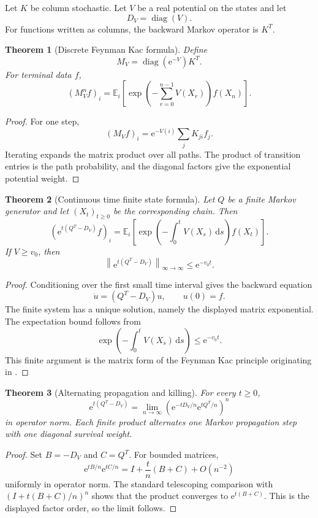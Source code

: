\documentclass{aomart}
\newtheorem{theorem}{Theorem}[section]
\theoremstyle{definition}
\theoremstyle{remark}
\newcommand{\Exp}{\mathbb E}
\newcommand{\diag}{\operatorname{diag}}
\newcommand{\e}{\mathrm e}
\newcommand{\dd}{\,\mathrm d}
\newcommand{\norm}[1]{\left\lVert#1\right\rVert}
\begin{document}
Let \(K\) be column stochastic. Let \(V\) be a real potential on the states and let
\[
D_V=\diag(V).
\]
For functions written as columns, the backward Markov operator is \(K^T\).

\begin{theorem}[Discrete Feynman Kac formula]\label{thm:discrete_feynman_kac}
Define
\[
M_V=\diag(\e^{-V})K^T.
\]
For terminal data \(f\),
\[
(M_V^nf)_i
=
\Exp_i\left[
\exp\left(
-\sum_{r=0}^{n-1}V(X_r)
\right)
f(X_n)
\right].
\]
\end{theorem}

\begin{proof}
For one step,
\[
(M_Vf)_i
=
\e^{-V(i)}\sum_jK_{ji}f_j.
\]
Iterating expands the matrix product over all paths. The product of transition entries is the path probability, and the diagonal factors give the exponential potential weight.
\end{proof}

\begin{theorem}[Continuous time finite state formula]\label{thm:continuous_feynman_kac}
Let \(Q\) be a finite Markov generator and let \((X_t)_{t\geq0}\) be the corresponding chain. Then
\[
\left(
\e^{t(Q^T-D_V)}f
\right)_i
=
\Exp_i\left[
\exp\left(
-\int_0^tV(X_s)\dd s
\right)
f(X_t)
\right].
\]
If \(V\geq v_0\), then
\[
\norm{\e^{t(Q^T-D_V)}}_{\infty\to\infty}
\leq
\e^{-v_0t}.
\]
\end{theorem}

\begin{proof}
Conditioning over the first small time interval gives the backward equation
\[
\dot u=(Q^T-D_V)u,
\qquad
u(0)=f.
\]
The finite system has a unique solution, namely the displayed matrix exponential. The expectation bound follows from
\[
\exp\left(-\int_0^tV(X_s)\dd s\right)
\leq
\e^{-v_0t}.
\]
This finite argument is the matrix form of the Feynman Kac principle originating in \cite{Kac1949}.
\end{proof}

\begin{theorem}[Alternating propagation and killing]\label{thm:feynman_kac_product}
For every \(t\geq0\),
\[
\e^{t(Q^T-D_V)}
=
\lim_{n\to\infty}
\left(
\e^{-tD_V/n}\e^{tQ^T/n}
\right)^n
\]
in operator norm. Each finite product alternates one Markov propagation step with one diagonal survival weight.
\end{theorem}

\begin{proof}
Set \(B=-D_V\) and \(C=Q^T\). For bounded matrices,
\[
\e^{tB/n}\e^{tC/n}
=
I+\frac{t}{n}(B+C)+O(n^{-2})
\]
uniformly in operator norm. The standard telescoping comparison with
\(
(I+t(B+C)/n)^n
\)
shows that the product converges to \(\e^{t(B+C)}\). This is the displayed factor order, so the limit follows.
\end{proof}
\end{document}
